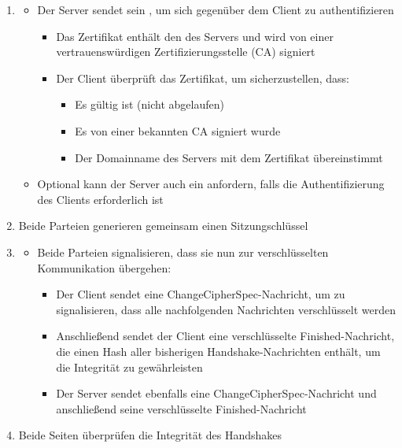 \begin{infoBox}[title=Ablauf des TLS 1.2 Handshakes]
\begin{enumerate}
\begin{itemize}
\begin{itemize}
                    \item {} Falls eine Sitzung wiederverwendet wird
                \end{itemize}
            \end{itemize}
        \item {}
        \begin{itemize}
            \item Der Server sendet sein , um sich gegenüber dem Client zu authentifizieren
            \begin{itemize}
                \item Das Zertifikat enthält den  des Servers und wird von einer vertrauenswürdigen Zertifizierungsstelle (CA) signiert
                \item Der Client überprüft das Zertifikat, um sicherzustellen, dass:
                \begin{itemize}
                    \item Es gültig ist (nicht abgelaufen)
                    \item Es von einer bekannten CA signiert wurde
                    \item Der Domainname des Servers mit dem Zertifikat übereinstimmt
                \end{itemize}
            \end{itemize}
            \item Optional kann der Server auch ein  anfordern, falls die Authentifizierung des Clients erforderlich ist
        \end{itemize}
        \item {} Beide Parteien generieren gemeinsam einen Sitzungschlüssel
        \item {}
        \begin{itemize}
            \item Beide Parteien signalisieren, dass sie nun zur verschlüsselten Kommunikation übergehen:
            \begin{itemize}
                \item Der Client sendet eine ChangeCipherSpec-Nachricht, um zu signalisieren, dass alle nachfolgenden Nachrichten verschlüsselt werden
                \item Anschließend sendet der Client eine verschlüsselte Finished-Nachricht, die einen Hash aller bisherigen Handshake-Nachrichten enthält, um die Integrität zu gewährleisten
                \item Der Server sendet ebenfalls eine ChangeCipherSpec-Nachricht und anschließend seine verschlüsselte Finished-Nachricht
            \end{itemize}
        \end{itemize}
        \item {} Beide Seiten überprüfen die Integrität des Handshakes
    \end{enumerate}
\end{infoBox}
